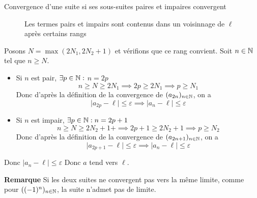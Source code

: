 \documentclass{article}
\renewenvironment{question_kholle}[2][ ]
{
	\subsection{\texorpdfstring{#2}{}}
	\notblank{#1}
	{
		\noindent #1
		\bigbreak
	}
	{}
	\begin{proof}
}
{
	\end{proof}
}
\begin{document}
\begin{question_kholle}{Convergence d'une suite si ses sous-suites paires et impaires convergent}
\begin{figure}[H]
    \caption{Les termes pairs et impairs sont contenus dans un voisinnage de $\ell$ après certains rangs}
  \end{figure}
  
  Posons $N = \max(2N_{1}, 2N_{2}+1)$ et vérifions que ce rang convient.
  Soit $n \in \mathbb N$ tel que $n \geqslant N$. 
  \begin{itemize}[label=$\star$]
    \item Si $n$ est pair, $\exists p \in \mathbb N :$ $n = 2p$
$$
    n\geqslant N \geqslant 2N_{1} \implies 2p \geqslant 2N_{1} \implies p \geqslant N_{1}
$$
    Donc d'après la définition de la convergence de $(a_{2n})_{n \in \mathbb N}$, on a
$$
    \lvert a_{2p} - \ell \rvert  \leqslant \varepsilon \implies \lvert a_{n} - \ell  \rvert  \leqslant \varepsilon
$$
    
    \item Si $n$ est impair, $\exists p \in \mathbb N : n = 2p +1$
$$
    n \geqslant N \geqslant 2N_{2}+1 +\implies 2p+1 \geqslant 2N_{2} + 1 \implies p \geqslant N_{2}
$$
    Donc d'après la définition de la convergence de $(a_{2n+1})_{n \in \mathbb N}$, on a 
$$
    \lvert a_{2p+1} - \ell\rvert  \leqslant \varepsilon \implies \lvert a_{n} - \ell \rvert \leqslant \varepsilon
$$
  \end{itemize}
  Donc $\lvert a_{n} - \ell  \rvert\leqslant \varepsilon$
  Donc $a$ tend vers $\ell$.
  
\end{question_kholle}
\textbf{Remarque} Si les deux suites ne convergent pas vers la même limite, comme pour $((-1)^{n})_{n \in \mathbb N}$, la suite n'admet pas de limite.
\end{document}
